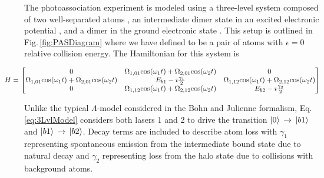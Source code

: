 The photoassociation experiment is modeled using a three-level system composed of two well-separated atoms , an intermediate dimer state in an excited electronic potential , and a dimer in the ground electronic state .
This setup is outlined in Fig.\,\ref{fig:PASDiagram} where we have defined  to be a pair of atoms with $\epsilon=0$ relative collision energy.
The Hamiltonian for this system is

\begin{equation} \label{eq:3LvlModel}
\hspace*{-1cm} 
	H=
    \begin{bmatrix}
      0 & \Omega_{1,01}\mathrm{cos}(\omega_1 t) + \Omega_{2,01}\mathrm{cos}(\omega_2 t) & 0 \\
      \Omega_{1,01}\mathrm{cos}(\omega_1 t)+ \Omega_{2,01}\mathrm{cos}(\omega_2 t) & E_{b1} - \imath \frac{\gamma_1}{2} & \Omega_{1,12}\mathrm{cos}(\omega_1 t)+ \Omega_{2,12}\mathrm{cos}(\omega_2 t) \\
      0 & \Omega_{1,12}\mathrm{cos}(\omega_1 t)+ \Omega_{2,12}\mathrm{cos}(\omega_2 t) & E_{b2} - \imath \frac{\gamma_2}{2} \\
    \end{bmatrix}
\end{equation}

\bigskip
Unlike the typical $\Lambda$-model considered in the Bohn and Julienne formalism, Eq.\,\ref{eq:3LvlModel} considers both lasers 1 and 2 to drive the transition $\left| {0} \right>\,\rightarrow\,\left| {b1} \right>$ and $\left| {b1} \right>\,\rightarrow\,\left| {b2} \right>$.
Decay terms are included to describe atom loss with $\gamma_1$ representing spontaneous emission from the intermediate bound state due to natural decay and $\gamma_2$ representing loss from the halo state due to collisions with background atoms.


